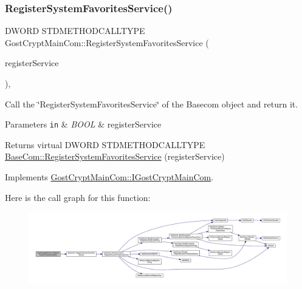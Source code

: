 \subsubsection{\texorpdfstring{Register\+System\+Favorites\+Service()}{RegisterSystemFavoritesService()}}
{\footnotesize\ttfamily D\+W\+O\+RD S\+T\+D\+M\+E\+T\+H\+O\+D\+C\+A\+L\+L\+T\+Y\+PE Gost\+Crypt\+Main\+Com\+::\+Register\+System\+Favorites\+Service (\begin{DoxyParamCaption}\item[{B\+O\+OL}]{register\+Service }\end{DoxyParamCaption})\hspace{0.3cm}{\ttfamily [inline]}, {\ttfamily [virtual]}}



Call the \char`\"{}\+Register\+System\+Favorites\+Service\char`\"{} of the Basecom object and return it. 


\begin{DoxyParams}[1]{Parameters}
\mbox{\tt in}  & {\em B\+O\+OL} & register\+Service \\
\hline
\end{DoxyParams}
\begin{DoxyReturn}{Returns}
virtual D\+W\+O\+RD S\+T\+D\+M\+E\+T\+H\+O\+D\+C\+A\+L\+L\+T\+Y\+PE \hyperlink{class_base_com_aa5bd0c7ed2b559f9be436622febb3dfb}{Base\+Com\+::\+Register\+System\+Favorites\+Service} (register\+Service) 
\end{DoxyReturn}


Implements \hyperlink{interface_gost_crypt_main_com_1_1_i_gost_crypt_main_com}{Gost\+Crypt\+Main\+Com\+::\+I\+Gost\+Crypt\+Main\+Com}.

Here is the call graph for this function\+:
\nopagebreak
\begin{figure}[H]
\begin{center}
\leavevmode
\includegraphics[width=350pt]{class_gost_crypt_main_com_a25487f06b5cd4f49bc4e214f453fbc9d_cgraph}
\end{center}
\end{figure}
\mbox{\label{class_gost_crypt_main_com_ae0b2e0989537d56b294a5bf34f46f7b4}} 
